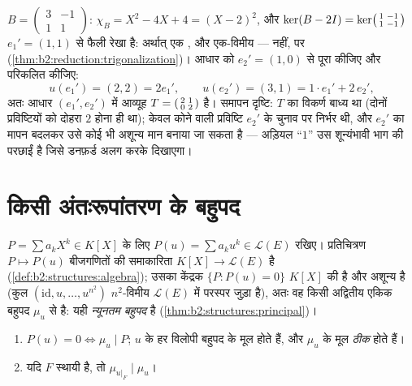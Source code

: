 \begin{example}[हाथ से त्रिभुजन]\label{ex:b2:reduction:trigwork}
$B = \begin{pmatrix}3 & -1\\ 1 & 1\end{pmatrix}$: $\chi_B = X^2 -
4X + 4 = (X - 2)^2$, और $\ker(B - 2I) =
\ker\begin{psmallmatrix}1 & -1\\ 1 & -1\end{psmallmatrix}$ $e_1' = (1, 1)$ से फैली रेखा है: अर्थात् एक , और
एक-विमीय  ---  नहीं, पर  (\cref{thm:b2:reduction:trigonalization})।
आधार को $e_2' = (1, 0)$ से पूरा कीजिए और परिकलित कीजिए:
\[
u(e_1') = (2, 2) = 2e_1',
\qquad
u(e_2') = (3, 1) = 1\cdot e_1' + 2\, e_2' ,
\]
अतः आधार $(e_1', e_2')$ में आव्यूह $T =
\begin{psmallmatrix}2 & 1\\ 0 & 2\end{psmallmatrix}$ है। समापन दृष्टि: $T$ का विकर्ण बाध्य था
(दोनों प्रविष्टियों को दोहरा  $2$ होना ही था); केवल कोने
वाली प्रविष्टि $e_2'$ के चुनाव पर निर्भर थी, और $e_2'$ का मापन बदलकर उसे
कोई भी अशून्य मान बनाया जा सकता है --- अड़ियल ``$1$'' उस शून्यंभावी
भाग की परछाईं है जिसे डनफ़र्ड अलग करके दिखाएगा।
\end{example}

\section{किसी अंतःरूपांतरण के बहुपद}

\begin{definition}\label{def:b2:reduction:polyu}
$P = \sum a_k X^k \in K[X]$ के लिए $P(u) = \sum a_k u^k \in
\mathcal{L}(E)$ रखिए। प्रतिचित्रण $P \mapsto P(u)$ बीजगणितों की समाकारिता $K[X] \to \mathcal{L}(E)$ है
(\cref{def:b2:structures:algebra}); उसका केंद्रक $\{P : P(u) = 0\}$ $K[X]$ की  है और अशून्य है (कुल $(\mathrm{id}, u, \dots, u^{n^2})$
$n^2$-विमीय $\mathcal{L}(E)$ में परस्पर जुड़ा है), अतः वह किसी अद्वितीय एकिक बहुपद
$\mu_u$ से  है: यही \emph{न्यूनतम बहुपद} है
(\cref{thm:b2:structures:principal})।
\end{definition}

\begin{proposition}\label{prop:b2:reduction:minpoly}
\begin{enumerate}
  \item $P(u) = 0 \iff \mu_u \mid P$; $u$ के  हर विलोपी बहुपद के मूल होते हैं,
        और $\mu_u$ के मूल \emph{ठीक}  होते हैं।
  \item यदि $F$ स्थायी है, तो $\mu_{u|_F} \mid \mu_u$।
\end{enumerate}
\end{proposition}

